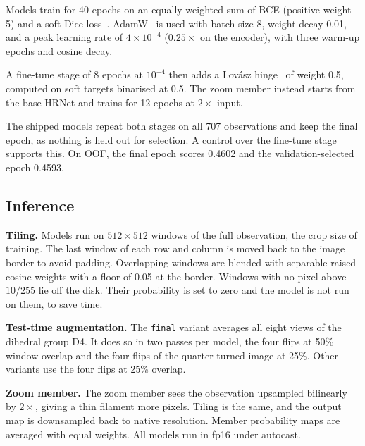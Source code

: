 \documentclass[sigconf,pbalance]{acmart}
\begin{document}
    Models train for 40 epochs on an equally weighted sum of BCE (positive weight 5) and a soft Dice loss~\cite{milletari2016vnet}.
    AdamW~\cite{loshchilov2019adamw} is used with batch size 8, weight decay 0.01, and a peak learning rate of $4\times10^{-4}$ ($0.25\times$ on the encoder), with three warm-up epochs and cosine decay.

    A fine-tune stage of 8 epochs at $10^{-4}$ then adds a Lovász hinge~\cite{berman2018lovasz} of weight 0.5, computed on soft targets binarised at 0.5.
    The zoom member instead starts from the base HRNet and trains for 12 epochs at $2\times$ input.

    The shipped models repeat both stages on all 707 observations and keep the final epoch, as nothing is held out for selection.
    A control over the fine-tune stage supports this.
    On OOF, the final epoch scores 0.4602 and the validation-selected epoch 0.4593.

    \subsection{Inference}\label{subsec:inference}
    \textbf{Tiling.}
    Models run on $512\times512$ windows of the full observation, the crop size of training.
    The last window of each row and column is moved back to the image border to avoid padding.
    Overlapping windows are blended with separable raised-cosine weights with a floor of 0.05 at the border.
    Windows with no pixel above $10/255$ lie off the disk.
    Their probability is set to zero and the model is not run on them, to save time.

    \textbf{Test-time augmentation.}
    The \texttt{final} variant averages all eight views of the dihedral group D4.
    It does so in two passes per model, the four flips at 50\% window overlap and the four flips of the quarter-turned image at 25\%.
    Other variants use the four flips at 25\% overlap.

    \textbf{Zoom member.}
    The zoom member sees the observation upsampled bilinearly by $2\times$, giving a thin filament more pixels.
    Tiling is the same, and the output map is downsampled back to native resolution.
    Member probability maps are averaged with equal weights.
    All models run in fp16 under autocast.
\end{document}
